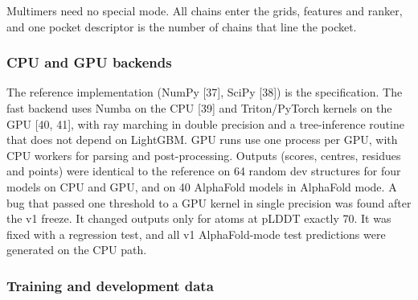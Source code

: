 \documentclass[10pt,letterpaper]{article}
\begin{document}
Multimers need no special mode. All chains enter the grids, features and ranker, and one pocket descriptor is the number of chains that line the pocket.

\subsubsection*{CPU and GPU backends}

The reference implementation (NumPy [37], SciPy [38]) is the specification. The fast backend uses Numba on the CPU [39] and Triton/PyTorch kernels on the GPU [40, 41], with ray marching in double precision and a tree-inference routine that does not depend on LightGBM. GPU runs use one process per GPU, with CPU workers for parsing and post-processing. Outputs (scores, centres, residues and points) were identical to the reference on 64 random dev structures for four models on CPU and GPU, and on 40 AlphaFold models in AlphaFold mode. A bug that passed one threshold to a GPU kernel in single precision was found after the v1 freeze. It changed outputs only for atoms at pLDDT exactly 70. It was fixed with a regression test, and all v1 AlphaFold-mode test predictions were generated on the CPU path.

\subsubsection*{Training and development data}
\end{document}
